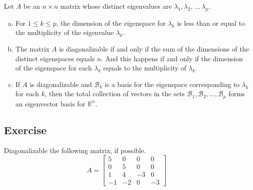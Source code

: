 \documentclass[aima104_lecturenotes_ku.tex]{subfiles}
\begin{document}
\begin{theorem}
  Let $A$ be an $n \times n$ matrix whose distinct eigenvalues are $\lambda_1, \lambda_2,\, ...\, \lambda_p$.
  \begin{enumerate}[a. ]
  \item For $1 \leq k \leq p$, the dimension of the eigenspace for $\lambda_k$ is less than or equal to the multiplicity of the eigenvalue $\lambda_k$.
  \item The matrix $A$ is diagonalizable if and only if the sum of the dimensions of the distinct eigenspaces equals $n$. And this happens if and only if the dimension of the eigenspace for each $\lambda_k$ equals to the multiplicity of $\lambda_k$.
   \item If $A$ is diagonalizable and $\mathcal{B}_k$ is a basis for the eigenspace corresponding to $\lambda_k$ for each $k$, then the total collection of vectors in the sets $\mathcal{B}_1, \mathcal{B}_2, ..., \mathcal{B}_p$ forms an eigenvector basis for $\mathbb{R}^n$.
  \end{enumerate}
\end{theorem}

\subsection{Exercise}
Diagonalizable the following matrix, if possible.
$$A=
\begin{bmatrix}
  5 & 0 & 0 & 0 \\
  0 & 5 & 0 & 0 \\
  1 & 4 & -3 & 0 \\
  -1 & -2 & 0 & -3
\end{bmatrix}
$$
\end{document}
